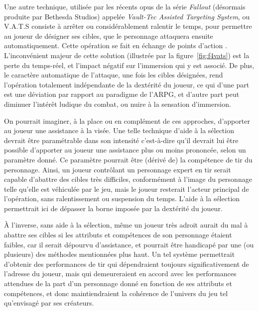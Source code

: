 	Une autre technique, utilisée par les récents opus de la série \emph{Fallout} (désormais produite par Bethesda Studios) appelée \emph{Vault-Tec Assisted Targeting System}, ou V.A.T.S consiste à arrêter ou considérablement ralentir le temps, pour permettre au joueur de désigner ses cibles, que le personnage attaquera ensuite automatiquement. Cette opération se fait en échange de \og points d'action \fg{}. L'inconvénient majeur de cette solution (illustrée par la figure~\ref{fig:f4vats}) est la perte du temps-réel, et l'impact négatif sur l'immersion qui y est associé. De plus, le caractère automatique de l'attaque, une fois les cibles désignées, rend l'opération totalement indépendante de la dextérité du joueur, ce qui d'une part est une déviation par rapport au paradigme de l'ARPG, et d'autre part peut diminuer l'intérêt ludique du combat, ou nuire à la sensation d'immersion.
	
	On pourrait imaginer, à la place ou en complément de ces approches, d'apporter au joueur une assistance à la visée. Une telle technique d'aide à la sélection devrait être paramétrable dans son \og intensité \fg{} c'est-à-dire qu'il devrait lui être possible d'apporter au joueur une assistance plus ou moins prononcée, selon un paramètre donné. Ce paramètre pourrait être (dérivé de) la compétence de tir du personnage. Ainsi, un joueur contrôlant un personnage expert en tir serait capable d'abattre des cibles très difficiles, conformément à l'image du personnage telle qu'elle est véhiculée par le jeu, mais le joueur resterait l'acteur principal de l'opération, sans ralentissement ou suspension du temps. L'aide à la sélection permettrait ici de dépasser la \og borne \fg{} imposée par la dextérité du joueur.
	
	À l'inverse, sans aide à la sélection, même un joueur très adroit aurait du mal à abattre ses cibles si les attributs et compétences de son personnage étaient faibles, car il serait dépourvu d'assistance, et pourrait être handicapé par une (ou plusieurs) des méthodes mentionnées plus haut. Un tel système permettrait d'obtenir des performances de tir qui dépendraient toujours significativement de l'adresse du joueur, mais qui demeureraient en accord avec les performances attendues de la part d'un personnage donné en fonction de ses attributs et compétences, et donc maintiendraient la cohérence de l'univers du jeu tel qu'envisagé par ses créateurs.
	
